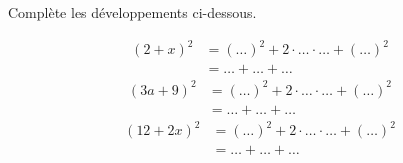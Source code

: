 %
%
Complète les développements ci-dessous.
  \begin{tasks}
    \task
    \begin{align*}
      \left(2+x\right)^2
      &= \left(\dots\right)^2 + 2 \cdot \dots \cdot \dots + \left(\dots\right)^2 \\
      &= \dots + \dots + \dots
    \end{align*}
    \task
    \begin{align*}
      \left(3a+9\right)^2
      &= \left(\dots\right)^2 + 2 \cdot \dots \cdot \dots + \left(\dots\right)^2 \\
      &= \dots + \dots + \dots
    \end{align*}
    \task
    \begin{align*}
      \left(12+2x\right)^2
      &= \left(\dots\right)^2 + 2 \cdot \dots \cdot \dots + \left(\dots\right)^2 \\
      &= \dots + \dots + \dots
    \end{align*}
  \end{tasks}
